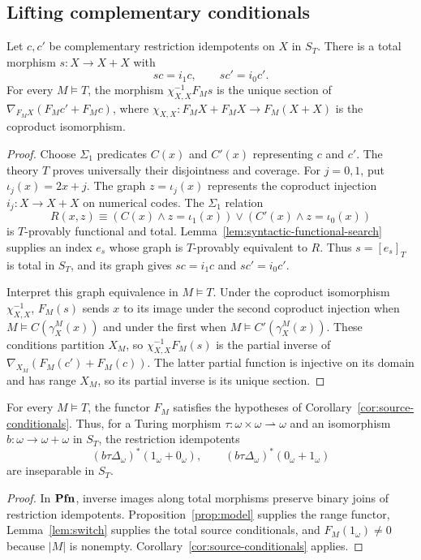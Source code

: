 \subsection{Lifting complementary conditionals}

\begin{lemma}\label{lem:switch}
Let $c,c'$ be complementary restriction idempotents on $X$ in $S_T$.
There is a total morphism $s:X\to X+X$ with
\[
 sc=i_1c,\qquad sc'=i_0c'.
\]
For every $M\models T$, the morphism $\chi_{X,X}^{-1}F_Ms$ is the
unique section of $\nabla_{F_MX}(F_Mc'+F_Mc)$, where
$\chi_{X,X}:F_MX+F_MX\to F_M(X+X)$ is the coproduct isomorphism.
\end{lemma}
\begin{proof}
Choose $\Sigma_1$ predicates $C(x)$ and $C'(x)$ representing
$c$ and $c'$.
The theory $T$ proves universally their disjointness and coverage.
For $j=0,1$, put $\iota_j(x)=2x+j$. The graph
$z=\iota_j(x)$ represents the coproduct injection
$i_j:X\to X+X$ on numerical codes.
The $\Sigma_1$ relation
\[
 R(x,z)\equiv
 (C(x)\land z=\iota_1(x))\lor(C'(x)\land z=\iota_0(x))
\]
is $T$-provably functional and total.
Lemma~\ref{lem:syntactic-functional-search} supplies an index $e_s$
whose graph is $T$-provably equivalent to $R$. Thus $s=[e_s]_T$
is total in $S_T$, and its graph gives $sc=i_1c$ and $sc'=i_0c'$.

Interpret this graph equivalence in $M\models T$.
Under the coproduct isomorphism $\chi_{X,X}^{-1}$, $F_M(s)$ sends
$x$ to its image under the second coproduct injection when
$M\models C(\gamma_X^M(x))$ and under the first when
$M\models C'(\gamma_X^M(x))$.
These conditions partition $X_M$, so
$\chi_{X,X}^{-1}F_M(s)$ is the partial inverse of
$\nabla_{X_M}(F_M(c')+F_M(c))$. The latter partial function is injective
on its domain and has range $X_M$, so its partial inverse is its
unique section.
\end{proof}

\begin{corollary}\label{cor:model-pair}
For every $M\models T$, the functor $F_M$ satisfies the hypotheses of
Corollary~\ref{cor:source-conditionals}. Thus, for a Turing morphism
$\tau:\omega\times\omega\rightharpoonup\omega$ and an isomorphism
$b:\omega\to\omega+\omega$ in $S_T$, the restriction idempotents
\[
 (b\tau\Delta_\omega)^*(1_\omega+0_\omega),\qquad
 (b\tau\Delta_\omega)^*(0_\omega+1_\omega)
\]
are inseparable in $S_T$.
\end{corollary}
\begin{proof}
In $\mathbf{Pfn}$, inverse images along total morphisms preserve binary joins of restriction
idempotents. Proposition~\ref{prop:model} supplies the range functor,
Lemma~\ref{lem:switch} supplies the total source conditionals, and
$F_M(1_\omega)\ne0$ because $|M|$ is nonempty.
Corollary~\ref{cor:source-conditionals} applies.
\end{proof}


